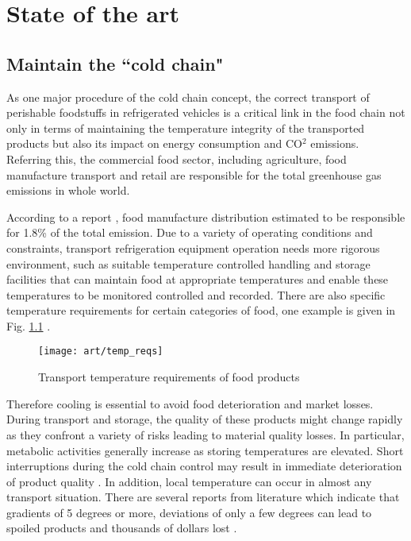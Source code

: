 \chapter{State of the art}     %
\section*{Maintain the ``cold chain"}

As one major procedure of the cold chain concept, the correct transport of perishable foodstuffs in refrigerated vehicles is a critical link in the food chain not only in terms of maintaining the temperature integrity of the transported products but also its impact on energy consumption and CO$^2$ emissions. Referring this, the  commercial food sector, including agriculture, food manufacture transport and retail are responsible for the total greenhouse gas emissions in whole world.

According to a report \citep{watkiss2005validity}, food manufacture distribution estimated to be responsible for 1.8\% of the total emission. Due to a variety of operating conditions and constraints, transport refrigeration equipment operation needs more rigorous environment, such as suitable temperature controlled handling and storage facilities that can maintain food at appropriate temperatures and enable these temperatures to be monitored controlled and recorded. There are also specific temperature requirements for certain categories of food, one example is given in Fig. \ref{tem_reqs} \citep{tem_reqs}.
\begin{figure}[ht]
	\centering
	\texttt{[image: art/temp\_reqs]}
	\label{tem_reqs}
	\caption{Transport temperature requirements of food products}
\end{figure}

Therefore cooling is essential to avoid food deterioration and market losses.  During transport and storage, the quality of these products might change rapidly as they confront a variety of risks leading to material quality losses. In particular, metabolic activities generally increase as storing temperatures are elevated. Short interruptions during the cold chain control may result in immediate deterioration of product quality \citep{Nunes2003Quality}. In addition, local temperature can occur in almost any transport situation. There are several reports from literature which indicate that gradients of 5 degrees or more, deviations of only a few degrees can lead to spoiled products and thousands of dollars lost \citep{Tanner2003Modelling, Nunes2006Brief, Rodriguez-Bermejo2007Thermal}.

